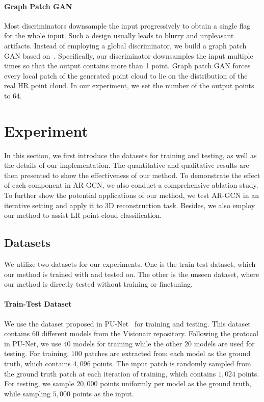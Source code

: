 \documentclass[10pt,twocolumn,letterpaper]{article}
\begin{document}
\vspace{-1em}
\paragraph{Graph Patch GAN}
Most discriminators downsample the input progressively to obtain a single flag for the whole input.
Such a design usually leads to blurry and unpleasant artifacts.
Instead of employing a global discriminator, we build a graph patch GAN based on~\cite{shrivastava2017learning}.
Specifically, our discriminator downsamples the input multiple times so that the output contains more than 1 point.
Graph patch GAN forces every local patch of the generated point cloud to lie on the distribution of the real HR point cloud.
In our experiment, we set the number of the output points to 64.

\section{Experiment}
In this section, we first introduce the datasets for training and testing, as well as the details of our implementation.
The quantitative and qualitative results are then presented to show the effectiveness of our method.
To demonstrate the effect of each component in AR-GCN, we also conduct a comprehensive ablation study.
To further show the potential applications of our method, we test AR-GCN in an iterative setting and apply it to 3D reconstruction task.
Besides, we also employ our method to assist LR point cloud classification.

\subsection{Datasets}
We utilize two datasets for our experiments.
One is the train-test dataset, which our method is trained with and tested on.
The other is the unseen dataset, where our method is directly tested without training or finetuning.

\vspace{-1em}
\paragraph{Train-Test Dataset}
We use the dataset proposed in PU-Net~\cite{yu2018pu} for training and testing.
This dataset contains $60$ different models from the Visionair repository.
Following the protocol in PU-Net, we use $40$ models for training while the other $20$ models are used for testing.
For training, $100$ patches are extracted from each model as the ground truth, which contains $4,096$ points.
The input patch is randomly sampled from the ground truth patch at each iteration of training, which contains $1,024$ points.
For testing, we sample $20,000$ points uniformly per model as the ground truth, while sampling $5,000$ points as the input.
\end{document}
